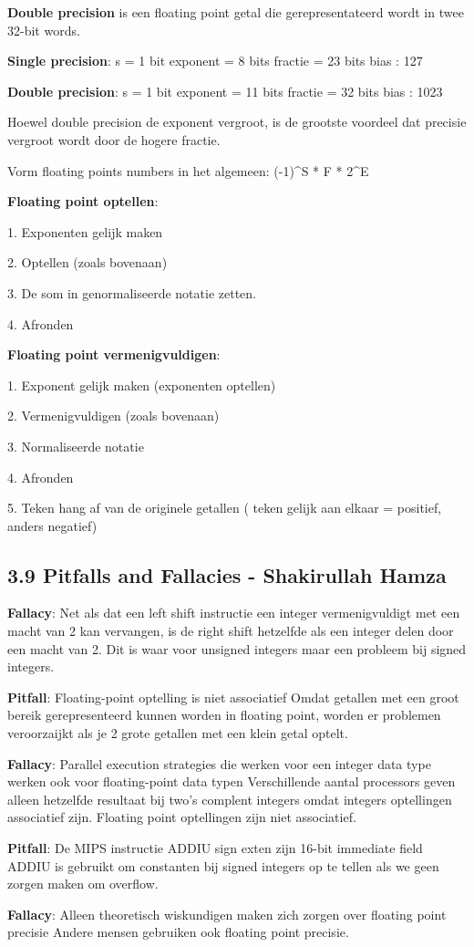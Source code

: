 \textbf{Double precision} is een floating point getal die gerepresentateerd wordt in twee 32-bit words.

\textbf{Single precision}:	s = 1 bit		exponent = 8 bits	fractie = 23 bits 	bias : 127

\textbf{Double precision}:	s = 1 bit		exponent = 11 bits	fractie = 32 bits		bias : 1023

Hoewel double precision de exponent vergroot, is de grootste voordeel dat precisie vergroot wordt door de hogere fractie.

Vorm floating points numbers in het algemeen:		(-1)^S * F * 2^E

\textbf{Floating point optellen}: 

1.	Exponenten gelijk maken

2.	Optellen (zoals bovenaan)

3.	De som in genormaliseerde notatie zetten.

4.	Afronden


\textbf{Floating point vermenigvuldigen}:

1.	Exponent gelijk maken	(exponenten optellen)

2.	Vermenigvuldigen	(zoals bovenaan)

3.	Normaliseerde notatie

4.	Afronden

5.	Teken hang af van de originele getallen ( teken gelijk aan elkaar = positief, anders negatief)


\subsection{3.9 Pitfalls and Fallacies - Shakirullah Hamza}							
												        
\begin{figure}
\end{figure}

\textbf{Fallacy}: Net als dat een left shift instructie een integer vermenigvuldigt met een macht van 2 kan vervangen, is de right shift hetzelfde als een integer delen door een macht van 2.
Dit is waar voor unsigned integers maar een probleem bij signed integers.

\textbf{Pitfall}: Floating-point optelling is niet associatief
Omdat getallen met een groot bereik gerepresenteerd kunnen worden in floating point, worden er problemen veroorzaijkt als je 2 grote getallen met een klein getal optelt.

\textbf{Fallacy}: Parallel execution strategies die werken voor een integer data type werken ook voor floating-point data typen
Verschillende aantal processors geven alleen hetzelfde resultaat bij two’s complent integers omdat integers optellingen associatief zijn. Floating point optellingen zijn niet associatief.

\textbf{Pitfall}: De MIPS instructie ADDIU sign exten zijn 16-bit immediate field
ADDIU is gebruikt om constanten bij signed integers op te tellen als we geen zorgen maken om overflow.

\textbf{Fallacy}: Alleen theoretisch wiskundigen maken zich zorgen over floating point precisie
Andere mensen gebruiken ook floating point precisie.
